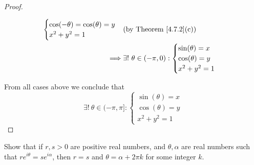 \begin{proof}
\begin{itemize}
\begin{align*}
\begin{cases}
                                                                 \cos(-\theta) = \cos(\theta) = y  \\
                                                                 x^2 + y^2 = 1
                                                             \end{cases}  & \text{(by Theorem \ref{4.7.2}(c))} \\
                  \implies & \exists!\ \theta \in (-\pi, 0) : \begin{cases}
                                                                  \sin(\theta) = x \\
                                                                  \cos(\theta) = y \\
                                                                  x^2 + y^2 = 1
                                                              \end{cases}
              \end{align*}
    \end{itemize}
    From all cases above we conclude that
    \[
        \exists!\ \theta \in (-\pi, \pi] : \begin{cases}
            \sin(\theta) = x \\
            \cos(\theta) = y \\
            x^2 + y^2 = 1
        \end{cases}
    \]
\end{proof}

\begin{exercise}\label{ex 4.7.5}
    Show that if \(r, s > 0\) are positive real numbers, and \(\theta, \alpha\) are real numbers such that \(r e^{i \theta} = s e^{i \alpha}\), then \(r = s\) and \(\theta = \alpha + 2 \pi k\) for some integer \(k\).
\end{exercise}

